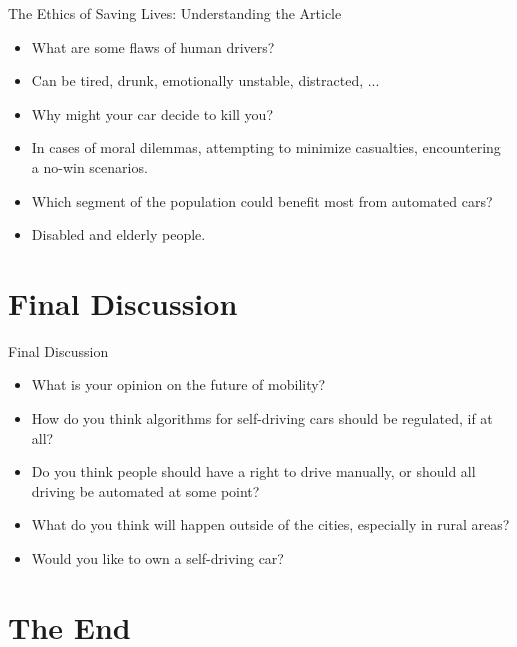 \documentclass{beamer}
\begin{document}
    \begin{frame}{The Ethics of Saving Lives: Understanding the Article}
        \begin{itemize}[<+-|alert@+>]
            \item
                What are some flaws of human drivers?
            \item[]
                Can be tired, drunk, emotionally unstable, distracted, ...
            \item
                Why might your car decide to kill you?
            \item[]
                In cases of moral dilemmas, attempting to minimize casualties, encountering a no-win scenarios.
            \item
                Which segment of the population could benefit most from automated cars?
            \item[]
                Disabled and elderly people.
        \end{itemize}
    \end{frame}

    \section{Final Discussion}

    \begin{frame}{Final Discussion}
        \begin{itemize}
            \item
                What is your opinion on the future of mobility?
            \item
                How do you think algorithms for self-driving cars should be regulated, if at all?
            \item
                Do you think people should have a right to drive manually, or should all driving be automated at some point?
            \item
                What do you think will happen outside of the cities, especially in rural areas?
            \item
                Would you like to own a self-driving car?
        \end{itemize}
    \end{frame}

    \section{The End}
\end{document}
